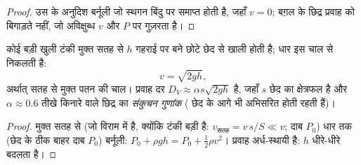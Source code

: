 \begin{proof}
उस  के अनुदिश बर्नूली जो स्थगन बिंदु पर समाप्त होती है, जहाँ
$v = 0$; बग़ल के छिद्र प्रवाह को बिगाड़ते नहीं, जो अविक्षुब्ध
$v$ और $P$ पर गुज़रता है।
\end{proof}

\begin{proposition}[टोरिचेली का सूत्र]\label{prop:b2:euler-bernoulli:torricelli}
कोई बड़ी खुली टंकी मुक्त सतह से $h$ गहराई पर बने छोटे छेद से खाली होती
है; धार इस चाल से निकलती है:
\[
v = \sqrt{2gh} ,
\]
अर्थात् सतह से मुक्त पतन की चाल। प्रवाह दर $D_V \approx
\alpha s\sqrt{2gh}$ है, जहाँ $s$ छेद का क्षेत्रफल है और $\alpha \approx 0.6$
तीखे किनारे वाले छिद्र का \emph{संकुचन गुणांक} ( छेद के
आगे भी अभिसरित होती रहती हैं)।
\end{proposition}

\begin{proof}
मुक्त सतह से (जो विराम में है, क्योंकि टंकी बड़ी है:
$v_{\text{सतह}} = v\,s/S \ll v$; दाब $P_0$) धार तक (छेद के ठीक बाहर दाब
$P_0$) बर्नूली: $P_0 + \rho gh = P_0 + \tfrac12\rho v^2$। प्रवाह
अर्ध-स्थायी है: $h$ धीरे-धीरे बदलता है।
\end{proof}

